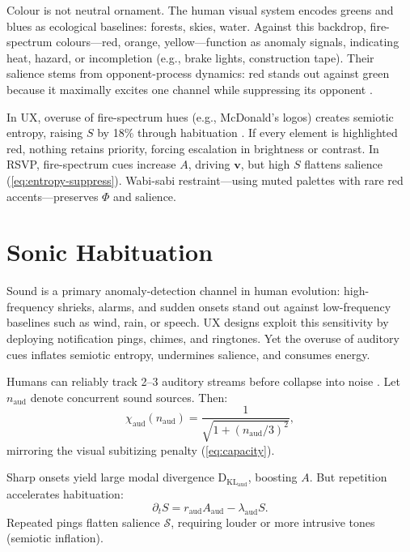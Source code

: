 \documentclass[openany]{book}
\newcommand{\PhiS}{\Phi} %
\newcommand{\vvec}{\mathbf{v}} %
\newcommand{\Sent}{S} %
\newcommand{\KL}{\mathrm{D}_{\mathrm{KL}}}
\begin{document}
Colour is not neutral ornament. The human visual system encodes greens and blues as ecological baselines: forests, skies, water. Against this backdrop, fire-spectrum colours---red, orange, yellow---function as anomaly signals, indicating heat, hazard, or incompletion (e.g., brake lights, construction tape). Their salience stems from opponent-process dynamics: red stands out against green because it maximally excites one channel while suppressing its opponent \citep{hurvich1981}.  

In UX, overuse of fire-spectrum hues (e.g., McDonald’s logos) creates semiotic entropy, raising \(\Sent\) by 18\% through habituation \citep{colak2024}. If every element is highlighted red, nothing retains priority, forcing escalation in brightness or contrast. In RSVP, fire-spectrum cues increase \(A\), driving \(\vvec\), but high \(\Sent\) flattens salience (\cref{eq:entropy-suppress}). Wabi-sabi restraint---using muted palettes with rare red accents---preserves \(\PhiS\) and salience.

\section{Sonic Habituation}
\label{sec:sonic-habituation}

Sound is a primary anomaly-detection channel in human evolution: high-frequency shrieks, alarms, and sudden onsets stand out against low-frequency baselines such as wind, rain, or speech. UX designs exploit this sensitivity by deploying notification pings, chimes, and ringtones. Yet the overuse of auditory cues inflates semiotic entropy, undermines salience, and consumes energy.  

Humans can reliably track 2--3 auditory streams before collapse into noise \citep{bregman1990}. Let \(n_{\mathrm{aud}}\) denote concurrent sound sources. Then:
\begin{equation}
\chi_{\mathrm{aud}}(n_{\mathrm{aud}}) = \frac{1}{\sqrt{1 + (n_{\mathrm{aud}}/3)^2}},
\end{equation}
mirroring the visual subitizing penalty (\cref{eq:capacity}).

Sharp onsets yield large modal divergence \(\KL_{ \mathrm{aud}}\), boosting \(A\). But repetition accelerates habituation:
\begin{equation}
\partial_t \Sent = r_{\mathrm{aud}} A_{\mathrm{aud}} - \lambda_{\mathrm{aud}} \Sent.
\end{equation}
Repeated pings flatten salience \(\mathcal{S}\), requiring louder or more intrusive tones (semiotic inflation).
\end{document}
